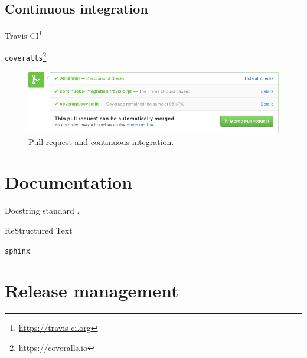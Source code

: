 \subsection{Continuous integration}

Travis CI\footnote{\url{https://travis-ci.org}}


\texttt{coveralls}\footnote{\url{https://coveralls.io}}

\begin{figure}
  \begin{centering}
    \includegraphics[width=5.5in]{fig/pull-request-ci.png}\par
  \end{centering}

  \caption{\label{fig:pull-request}Pull request and continuous integration.}
\end{figure}

\section{\label{sec:doc}Documentation}

Docstring standard \cite{SciPyProceedings_27}.

ReStructured Text

\texttt{sphinx}

\section{\label{sec:release}Release management}

